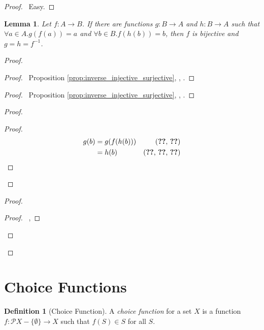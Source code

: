 \documentclass{report}
\let\qed\relax
\newtheorem{lm}[ax]{Lemma}
\theoremstyle{definition}
\newtheorem{df}[ax]{Definition}
\begin{document}
\begin{proof}
\pf\ Easy. \qed
\end{proof}

\begin{lm}
Let $f : A \rightarrow B$. If there are functions $g : B \rightarrow A$ and $h : B \rightarrow A$ such that $\forall a \in A. g(f(a)) = a$ and $\forall b \in B.f(h(b)) = b$, then $f$ is bijective and $g = h = f^{-1}$.
\end{lm}

\begin{proof}
\pf
{}
\begin{proof}
	\pf\ Proposition \ref{prop:inverse_injective_surjective}, , .
\end{proof}
\begin{proof}
	\pf\ Proposition \ref{prop:inverse_injective_surjective}, , .
\end{proof}
\begin{proof}
	\begin{proof}
		\pf
		\begin{align*}
			g(b) & = g(f(h(b))) & (\text{\stepref{4}, \stepref{a}}) \\
			& = h(b) & (\text{\stepref{3}, \stepref{2}, \stepref{a}})
		\end{align*}
	\end{proof}
\end{proof}
\begin{proof}
	\begin{proof}
		\pf\ , 
	\end{proof}
\end{proof}
\qed
\end{proof}

\section{Choice Functions}

\begin{df}[Choice Function]
A \emph{choice function} for a set $X$ is a function $f : \mathcal{P} X - \{\emptyset \} \rightarrow X$ such that $f(S) \in S$ for all $S$.
\end{df}
\end{document}
